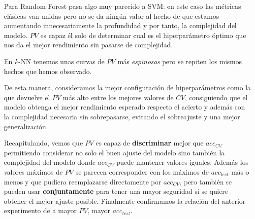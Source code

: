 Para Random Forest pasa algo muy parecido a SVM: en este caso las métricas clásicas van unidas pero no se da ningún valor al hecho de que estamos aumentando innecesariamente la profundidad y por tanto, la complejidad del modelo. $PV$ es capaz él solo de determinar cual es el hiperparámetro óptimo que nos da el mejor rendimiento sin pasarse de complejidad.

En $k$-NN tenemos unas curvas de $PV$ más \emph{espinosas} pero se repiten los mismos hechos que hemos observado.

De esta manera, consideramos la mejor configuración de hiperparámetros como la que devuelve el $PV$ más alto entre los mejores valores de $CV$, consiguiendo que el modelo obtenga el mejor rendimiento esperado respecto el acierto y además con la complejidad necesaria sin sobrepasarse, evitando el sobreajuste y una mejor generalización.

Recapitulando, vemos que $PV$ es capaz de \textbf{discriminar} mejor que $acc_{CV}$ permitiendo considerar no solo el buen ajuste del modelo sino también la complejidad del modelo donde $acc_{CV}$ puede mantener valores iguales. Además los valores máximos de $PV$ se parecen corresponder con los máximos de $acc_{test}$ más o menos y que pudiera reemplazarse directamente por $acc_{CV}$, pero también se pueden usar \textbf{conjuntamente} para tener una mayor seguridad si se quiere obtener el mejor ajuste posible. Finalmente confirmamos la relación del anterior experimento de a mayor $PV$, mayor $acc_{test}$.

\endinput
